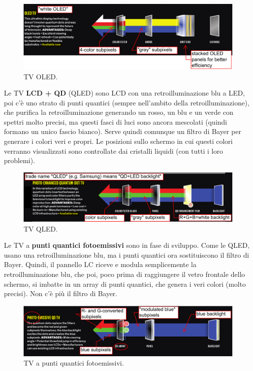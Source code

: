 \documentclass[a4paper,11pt]{article}
\begin{document}
\renewcommand{\thefigure}{4.18}
\begin{figure}[!h]
  \centering
    \includegraphics[scale=0.3]{images/4/tv_oled.png}
    \caption{TV OLED.}
\end{figure}

Le TV \textbf{LCD + QD} (QLED) sono LCD con una retroilluminazione blu a LED, poi c'è uno strato di punti quantici (sempre nell'ambito
della retroilluminazione), che purifica la retroilluminazione generando un rosso, un blu e un verde con spettri molto precisi, ma questi fasci di luci sono ancora mescolati
(quindi formano un unico fascio bianco). Serve quindi comunque un filtro di Bayer per generare i colori veri e propri. Le posizioni sullo 
schermo in cui questi colori verranno visualizzati sono controllate dai cristalli liquidi (con tutti i loro problemi).

\renewcommand{\thefigure}{4.19}
\begin{figure}[!h]
  \centering
    \includegraphics[scale=0.25]{images/4/tv_qled.png}
    \caption{TV QLED.}
\end{figure}

Le TV a \textbf{punti quantici fotoemissivi} sono in fase di sviluppo. Come le QLED, usano una retroilluminazione blu, ma
i punti quantici ora sostituiscono il filtro di Bayer. Quindi, il pannello LC riceve e modula semplicemente la retroilluminazione
blu, che poi, poco prima di raggiungere il vetro frontale dello schermo, si imbatte in un array di punti quantici, che genera i veri colori (molto precisi). Non c'è più il filtro di Bayer.

\renewcommand{\thefigure}{4.20}
\begin{figure}[!h]
  \centering
    \includegraphics[scale=0.25]{images/4/tv_pe_qd.png}
    \caption{TV a punti quantici fotoemissivi.}
\end{figure}
\end{document}
